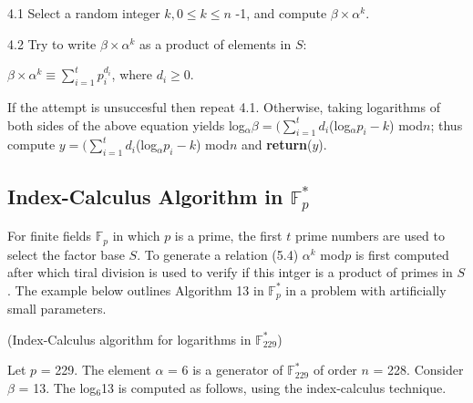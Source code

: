 \documentclass[iwp,first]{luthesis}
\begin{document}
\begin{algorithm}
\begin{algorithmic}
\begin{enumerate}
	4.1 Select a random integer $k, 0 \leq k \leq n$ -1, and compute $\beta \times \alpha^k$.
	
	4.2 Try to write $\beta \times \alpha^k$ as a product of elements in $S$:

\begin{center}

$\beta \times \alpha^k  \equiv \displaystyle\sum\limits_{i=1}^{t} p_{i}^{d_i}$, where $d_i \geq 0$.

\end{center}

	If the attempt is unsuccesful then repeat 4.1. Otherwise, taking logarithms of both sides of the above equation yields log$_{\alpha}\beta = (\displaystyle\sum\nolimits_{i = 1}^t d_i$(log$_{\alpha}p_{i} - k$) mod$n$; thus compute $y = (\displaystyle\sum\nolimits_{i = 1}^t d_i$(log$_{\alpha}p_{i} - k$) mod$n$ and \textbf{return}($y$).

\end{enumerate}
\end{algorithmic}
\end{algorithm}

\newpage

\subsection{Index-Calculus Algorithm in $\mathbb{F}_{p}^{*}$}

For finite fields $\mathbb{F}_p$ in which $p$ is a prime, the first $t$ prime numbers are used to select the factor base $S$. To generate a relation (5.4) $\alpha^k$ mod$p$ is first computed after which tiral division is used to verify if this intger is a product of primes in $S$. The example below outlines Algorithm 13 in $\mathbb{F}_{p}^{*}$ in a problem with artificially small parameters.

\begin{example}({Index-Calculus algorithm for logarithms in $\mathbb{F}_{229}^{*}$})
\end{example}

Let $p$ = 229. The element $\alpha$ = 6 is a generator of $\mathbb{F}_{229}^{*}$ of order $n$ = 228. Consider $\beta$ = 13. The log$_6$13 is computed as follows, using the index-calculus technique.
\end{document}
